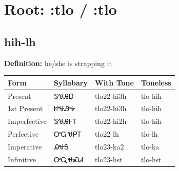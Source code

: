 \documentclass{article}%
\begin{document}
%
\normalsize%
\section*{Root: :tlo / :tlo}%
\subsection*{hih-lh}%
\textbf{Definition: }%
he/she is strapping it%
\\[0.5em]%
\begin{tabular}{|l|l|l|l|}%
\hline%
\textbf{Form}&\textbf{Syllabary}&\textbf{With Tone}&\textbf{Toneless}\\%
\hline%
Present&ᎦᏠᎯᎠ&tlo22{-}hi3h&tlo{-}hih\\%
1st Present&ᏥᏠᎯᎭ&tlo22{-}hi3h&tlo{-}hih\\%
Imperfective&ᎦᏠᎯᎰᎢ&tlo22{-}hi2h&tlo{-}hih\\%
Perfective&ᎤᏩᏠᏢᎢ&tlo22{-}lh&tlo{-}lh\\%
Imperative&ᎯᏠᎦ&tlo23{-}ka2&tlo{-}ka\\%
Infinitive&ᎤᏩᏠᏍᏗ&tlo23{-}hst&tlo{-}hst\\%
\hline%
\end{tabular}%
\\[1em]%
\end{document}
